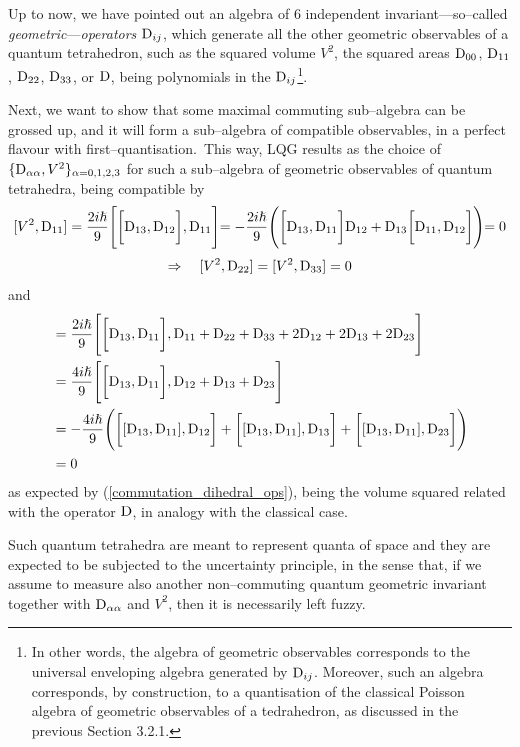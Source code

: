 Up to now, we have pointed out an algebra of $6$ independent invariant---so--called \emph{geometric}---\emph{operators} $\text{\normalfont D}_{ij}$, which generate all the other geometric observables of a quantum tetrahedron, such as the squared volume $V^2$, the squared areas $\text{\normalfont D}_{00}$, $\text{\normalfont D}_{11}$, $\text{\normalfont D}_{22}$, $\text{\normalfont D}_{33}$, or $\text{\normalfont D}$, being polynomials in the $\text{\normalfont D}_{ij}$\footnote{{In other words, the algebra of geometric observables corresponds to the universal enveloping algebra generated by $\text{\normalfont D}_{ij}$. Moreover, such an algebra corresponds, by construction, to a quantisation of the classical Poisson algebra of geometric observables of a tedrahedron, as discussed in the previous Section 3.2.1.} %
}.

Next, we want to show that some maximal commuting sub--algebra can be grossed up, and it will form a sub--algebra of compatible observables, in a perfect flavour with first--quantisation.\, This way, LQG results as the choice of $\{\text{\normalfont D}_{\alpha\alpha},V^2\}_{\alpha=0,1,2,3}$ for such a sub--algebra of geometric observables of quantum tetrahedra, being compatible by 
$$[V^2,\text{\normalfont D}_{11}]=\frac{2i\hslash}{9}\Biggl[\bigg[\text{\normalfont D}_{13},\text{\normalfont D}_{12}\bigg],\text{\normalfont D}_{11}\Biggl]=-\frac{2i\hslash}{9}\Biggl(\bigg[\text{\normalfont D}_{13},\text{\normalfont D}_{11}\bigg]\text{\normalfont D}_{12}+\text{\normalfont D}_{13}\bigg[\text{\normalfont D}_{11},\text{\normalfont D}_{12}\bigg]\Biggl)=0$$
$$\Rightarrow\quad[V^2,\text{\normalfont D}_{22}]=[V^2,\text{\normalfont D}_{33}]=0$$
and
\begin{align*}
    [V^2,\Dd_{00}]&=\frac{2i\hslash}{9}\Biggl[\bigg[\Dd_{13},\Dd_{11}\bigg],\Dd_{11}+\Dd_{22}+\Dd_{33}+2\Dd_{12}+2\Dd_{13}+2\Dd_{23}\Biggl]\\
    &=\frac{4i\hslash}{9}\Biggl[\bigg[\Dd_{13},\Dd_{11}\bigg],\Dd_{12}+\Dd_{13}+\Dd_{23}\Biggl]\\
    &=-\frac{4i\hslash}{9}\Biggl(\bigg[[\Dd_{13},\Dd_{11}],\Dd_{12}\bigg]+\bigg[[\Dd_{13},\Dd_{11}],\Dd_{13}\bigg]+\bigg[[\Dd_{13},\Dd_{11}],\Dd_{23}\bigg]\Biggl)\\
    &=0
\end{align*}
as expected by (\ref{commutation_dihedral_ops}), being the volume squared related with the operator $\text{\normalfont D}$, in analogy with the classical case.

Such quantum tetrahedra are meant to represent quanta of space and they are expected to be subjected to the uncertainty principle, in the sense that, if we assume to measure also another non--commuting quantum geometric invariant together with $\text{\normalfont D}_{\alpha\alpha}$ and $V^2$, then it is necessarily left fuzzy. 

